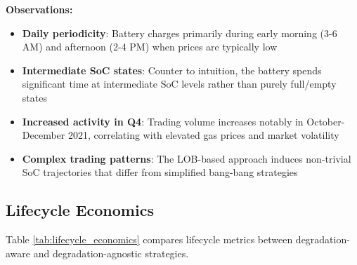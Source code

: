 \documentclass[10pt,twocolumn]{article}
\begin{document}
\textbf{Observations:}
\begin{itemize}
\item \textbf{Daily periodicity}: Battery charges primarily during early morning (3-6 AM) and afternoon (2-4 PM) when prices are typically low
\item \textbf{Intermediate SoC states}: Counter to intuition, the battery spends significant time at intermediate SoC levels rather than purely full/empty states
\item \textbf{Increased activity in Q4}: Trading volume increases notably in October-December 2021, correlating with elevated gas prices and market volatility
\item \textbf{Complex trading patterns}: The LOB-based approach induces non-trivial SoC trajectories that differ from simplified bang-bang strategies
\end{itemize}

\subsection{Lifecycle Economics}
Table \ref{tab:lifecycle_economics} compares lifecycle metrics between degradation-aware and degradation-agnostic strategies.

\end{document}
